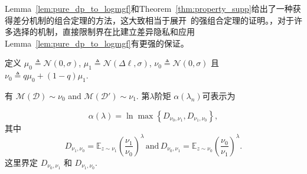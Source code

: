 Lemma~\ref{lem:pure_dp_to_logmgf}和Theorem~\ref{thm:property_supp}给出了一种获得差分机制的组合定理的方法，这大致相当于展开~\cite{Dwork2010boosting}的强组合定理的证明。，对于许多选择的机制，直接限制界在\logmgfa 比建立差异隐私和应用Lemma~\ref{lem:pure_dp_to_logmgf}有更强的保证。\cite{abadi2016DLwithDP, mcsherry2009privacy}

定义 $\mu_{0} \triangleq \mathcal{N}(0,\sigma)$, $\mu_{1} \triangleq \mathcal{N}(\Delta\ell,\sigma)$, $\nu_{0} \triangleq \mathcal{N}(0,\sigma)$ 且 $\nu_{0} \triangleq q\mu_{0}+(1-q)\mu_{1}$.

有 $\mathcal M(\mathcal{D})\sim \nu_0$ and $\mathcal M(\mathcal{D}')\sim \nu_1$.
第$\lambda$阶矩 $\alpha(\lambda_{n})$可表示为

\begin{equation}
\alpha(\lambda) = \ln\max \left\{D_{\nu_{0}, \nu_{1}}, D_{\nu_{1},\nu_{0}}\right\},
\end{equation}
其中
\begin{equation}
D_{\nu_{1},\nu_{0}}=\mathbb{E}_{z\sim \nu_{1}}\left(\frac{\nu_{1}}{\nu_{0}}\right)^{\lambda}\, \text{and}\,D_{\nu_{0},\nu_{1}}=\mathbb{E}_{z\sim \nu_{0}}\left(\frac{\nu_{0}}{\nu_{1}}\right)^{\lambda}.
\end{equation}
这里界定 $D_{\nu_{0}, \nu_{1}}$ 和 $D_{\nu_{1},\nu_{0}}$.

